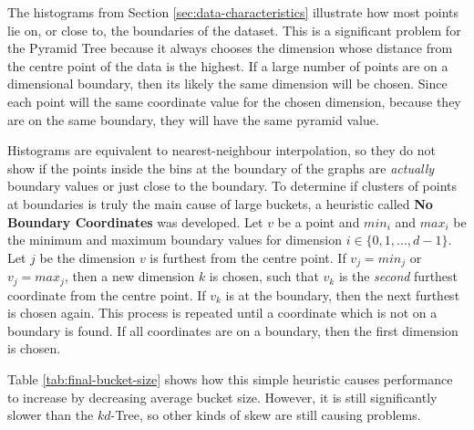 The histograms from Section \ref{sec:data-characteristics} illustrate how most points lie on, or close to, the boundaries of the dataset. This is a significant problem for the Pyramid Tree because it always chooses the dimension whose distance from the centre point of the data is the highest. If a large number of points are on a dimensional boundary, then its likely the same dimension will be chosen. Since each point will the same coordinate value for the chosen dimension, because they are on the same boundary, they will have the same pyramid value.

\begin{table}
	\centering
	\caption{Pyramid Tree Bucket Size Statistics with Different Dimensions of Astrophysics Dataset}
	\label{tab:final-bucket-size}
\end{table}

Histograms are equivalent to nearest-neighbour interpolation, so they do not show if the points inside the bins at the boundary of the graphs are \textit{actually} boundary values or just close to the boundary. To determine if clusters of points at boundaries is truly the main cause of large buckets, a heuristic called \textbf{No Boundary Coordinates} was developed. Let $v$ be a point and $min_i$ and $max_i$ be the minimum and maximum boundary values for dimension $i \in \lbrace 0, 1, ..., d - 1 \rbrace$. Let $j$ be the dimension $v$ is furthest from the centre point. If $v_j = min_j$ or $v_j = max_j$, then a new dimension $k$ is chosen, such that $v_k$ is the \textit{second} furthest coordinate from the centre point. If $v_k$ is at the boundary, then the next furthest is chosen again. This process is repeated until a coordinate which is not on a boundary is found. If all coordinates are on a boundary, then the first dimension is chosen.

Table \ref{tab:final-bucket-size} shows how this simple heuristic causes performance to increase by decreasing average bucket size. However, it is still significantly slower than the $kd$-Tree, so other kinds of skew are still causing problems.

